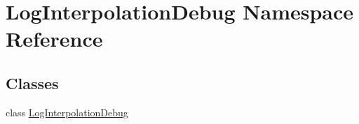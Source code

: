 \hypertarget{namespace_log_interpolation_debug}{\section{Log\-Interpolation\-Debug Namespace Reference}
\label{namespace_log_interpolation_debug}
}
\subsection*{Classes}
\begin{DoxyCompactItemize}
\item 
class \hyperlink{class_log_interpolation_debug_1_1_log_interpolation_debug}{Log\-Interpolation\-Debug}
\end{DoxyCompactItemize}
